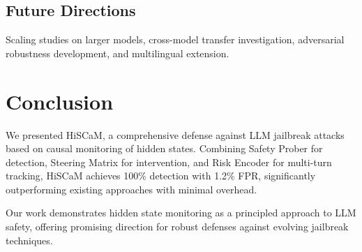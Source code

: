 \documentclass[10pt,twocolumn]{article}
\newcommand{\method}{HiSCaM}  %
\begin{document}
\subsection{Future Directions}

Scaling studies on larger models, cross-model transfer investigation, adversarial robustness development, and multilingual extension.

\section{Conclusion}

We presented \method{}, a comprehensive defense against LLM jailbreak attacks based on causal monitoring of hidden states. Combining Safety Prober for detection, Steering Matrix for intervention, and Risk Encoder for multi-turn tracking, \method{} achieves 100\% detection with 1.2\% FPR, significantly outperforming existing approaches with minimal overhead.

Our work demonstrates hidden state monitoring as a principled approach to LLM safety, offering promising direction for robust defenses against evolving jailbreak techniques.
\end{document}
